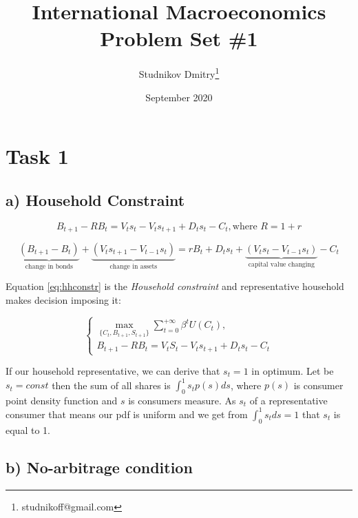 \documentclass{article}
\title{International Macroeconomics \\ Problem Set \#1}
\author{Studnikov Dmitry\thanks{studnikoff@gmail.com}}
\date{September 2020}
\begin{document}
\maketitle

\section*{Task 1} \label{sec:sec1}

\subsection*{a) Household Constraint}

\begin{equation} 
    B_{t+1} - RB_{t} = V_{t}s_{t} - V_{t}s_{t+1} +D_{t}s_{t} - C_{t}, \text{where } R = 1+r
\end{equation}

\begin{equation}
    \underbrace{(B_{t+1} - B_t)}_\text{change in bonds} + \underbrace{(V_{t}s_{t+1} - V_{t-1}s_{t})}_\text{change in assets} = rB_t + D_{t}s_{t} + \underbrace{(V_{t}s_{t} - V_{t-1}s_{t})}_\text{capital value changing} - C_t
    \label{eq:hhconstr}
\end{equation}

Equation \ref{eq:hhconstr} is the \textit{Household constraint} and representative household makes decision imposing it:

\begin{equation}
    \begin{cases}
        \max\limits_{\{C_{t}, B_{t+1}, S_{t+1}\}} \sum_{t = 0} ^ {+\infty}\beta^{t}U(C_t), \\
        B_{t+1} - RB_{t} = V_{t}S_{t} - V_{t}s_{t+1} +D_{t}s_{t} - C_{t}
    \end{cases}
\end{equation}

If our household representative, we can derive that $ s_t = 1 $ in optimum. Let be $ s_t = const $ then the sum of all shares is $ \int_{0}^{1}s_{t}p(s)ds $, where $ p(s) $ is consumer point density function and $ s $ is consumers measure. As $ s_t $ of a representative consumer that means our pdf is uniform and we get from $ \int_{0}^{1}s_{t}ds = 1$ that $ s_t $ is equal to 1.
\subsection*{b) No-arbitrage condition} \label{subsec:b}
\end{document}
